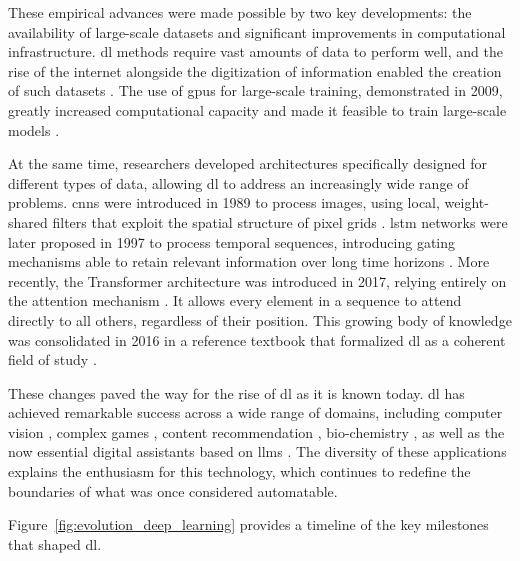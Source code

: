 These empirical advances were made possible by two key developments: the availability of large-scale datasets and significant improvements in computational infrastructure.
\gls{dl} methods require vast amounts of data to perform well, and the rise of the internet alongside the digitization of information enabled the creation of such datasets \parencite{hilbert2011world}.
The use of \glspl{gpu} for large-scale training, demonstrated in 2009, greatly increased computational capacity and made it feasible to train large-scale models \parencite{raina2009large, krizhevsky2012imagenet}.

At the same time, researchers developed architectures specifically designed for different types of data, allowing \gls{dl} to address an increasingly wide range of problems.
\glspl{cnn} were introduced in 1989 to process images, using local, weight-shared filters that exploit the spatial structure of pixel grids \parencite{lecun1989backpropagation}.
\gls{lstm} networks were later proposed in 1997 to process temporal sequences, introducing gating mechanisms able to retain relevant information over long time horizons \parencite{hochreiter1997long}.
More recently, the Transformer architecture was introduced in 2017, relying entirely on the attention mechanism \parencite{vaswani2017attention}.
It allows every element in a sequence to attend directly to all others, regardless of their position.
This growing body of knowledge was consolidated in 2016 in a reference textbook that formalized \gls{dl} as a coherent field of study \parencite{goodfellow2016deep}.

These changes paved the way for the rise of \gls{dl} as it is known today.
\gls{dl} has achieved remarkable success across a wide range of domains, including computer vision \parencite{krizhevsky2012imagenet}, complex games \parencite{silver2017mastering}, content recommendation \parencite{covington2016deep}, bio-chemistry \parencite{jumper2021highly}, as well as the now essential digital assistants based on \glspl{llm} \parencite{brown2020language}.
The diversity of these applications explains the enthusiasm for this technology, which continues to redefine the boundaries of what was once considered automatable.

Figure~\ref{fig:evolution_deep_learning} provides a timeline of the key milestones that shaped \gls{dl}.